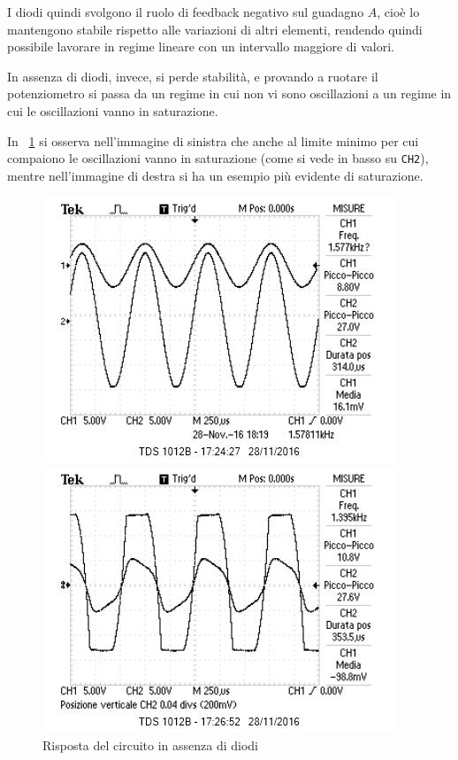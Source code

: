 \documentclass[10pt,a4paper]{article}
\def\code#1{\texttt{#1}}
\begin{document}
I diodi quindi svolgono il ruolo di feedback negativo sul guadagno $A$, cioè lo mantengono stabile rispetto alle variazioni di altri elementi, rendendo quindi possibile lavorare in regime lineare con un intervallo maggiore di valori.

In assenza di diodi, invece, si perde stabilità, e provando a ruotare il potenziometro si passa da un regime in cui non vi sono oscillazioni a un regime in cui le oscillazioni vanno in saturazione.

In \figurename{~\ref{fig:wdiod}} si osserva nell'immagine di sinistra che anche al limite minimo per cui compaiono le oscillazioni vanno in saturazione (come si vede in basso su \code{CH2}), mentre nell'immagine di destra si ha un esempio più evidente di saturazione.

\begin{figure}[H]
    \centering
    \begin{minipage}{0.49\textwidth}
	    \includegraphics[width=\textwidth]{../oscilloscopio/punto5.jpg}
    \end{minipage}
    \begin{minipage}{0.49\textwidth}
        \includegraphics[width=\textwidth]{../oscilloscopio/punto5(scazzo).jpg}
    \end{minipage}
    \caption{Risposta del circuito in assenza di diodi}
    \label{fig:wdiod}
\end{figure}
\end{document}
